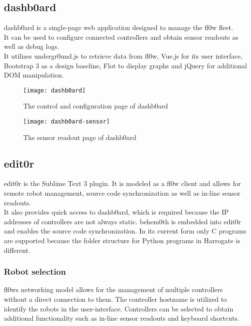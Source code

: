 \documentclass[conference,a4paper]{IEEEtran}
\begin{document}
\subsection{dashb0ard}
dashb0ard\cite{dashb0ard:Sebastian Schaffler} is a single-page web application designed to manage the fl0w fleet.\\ It can be used to configure connected controllers and obtain sensor readouts as well as debug logs. \\It utilizes undergr0und.js to retrieve data from fl0w, Vue.js\cite{Vue:Evan You} for its user interface, Bootstrap 3\cite{Bootstrap 3:Twitter Inc.} as a design baseline, Flot\cite{Flot:David Schnur} to display graphs and jQuery\cite{jQuery:jQuery Foundation} for additional DOM manipulation.

\begin{figure}[H]
\centering
\texttt{[image: dashb0ard]}
\caption{The control and configuration page of dashb0ard}
\label{fig:dashb0ard_config}
\end{figure}

\begin{figure}[H]
\centering
\texttt{[image: dashb0ard-sensor]}
\caption{The sensor readout page of dashb0ard}
\label{fig:dashb0ard_sensor}
\end{figure}
\subsection{edit0r}
edit0r\cite{edit0r:Philip Trauner} is the Sublime Text 3 plugin. It is modeled as a fl0w client and allows for remote robot management, source code synchronization as well as in-line sensor readouts. \\It also provides quick access to dashb0ard, which is required because the IP addresses of controllers are not always static. behem0th is embedded into edit0r and enables the source code synchronization. In its current form only C programs are supported because the folder structure for Python programs in Harrogate is different.\\

\subsubsection{Robot selection}
fl0ws networking model allows for the management of multiple controllers without a direct connection to them. The controller hostname is utilized to identify the robots in the user-interface. Controllers can be selected to obtain additional functionality such as in-line sensor readouts and keyboard shortcuts.\\
\end{document}
